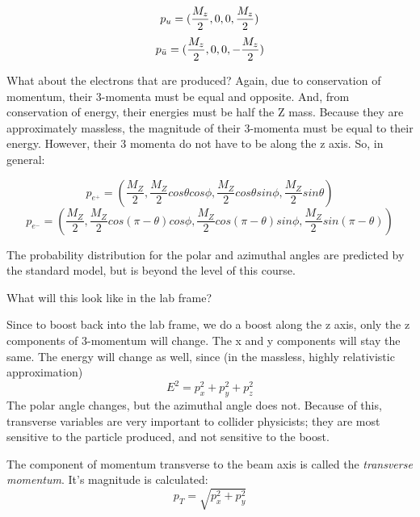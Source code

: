 \begin{equation}
 p_{u} = ( {M_z \over 2},0,0,{M_z \over 2})
\end{equation}
\begin{equation}
 p_{\bar{u}} = ( {M_z \over 2},0,0,-{M_z \over 2})
\end{equation}

\noindent What about the electrons that are produced?  Again, due to conservation of momentum, their 3-momenta must be equal and opposite.  And, from conservation of energy, their energies must be half the Z mass.  Because they are approximately massless, the magnitude of their 3-momenta must be equal to their energy.  However, their 3 momenta do not have to be along the z axis.  So, in general:

\begin{equation}
 p_{e^+} = (\frac{M_Z}{2}, \frac{M_Z}{2} cos \theta cos \phi ,  \frac{M_Z}{2} cos \theta sin \phi , \frac{M_Z}{2} sin \theta) 
\end{equation}
\begin{equation}
 p_{e^-} = (\frac{M_Z}{2}, \frac{M_Z}{2} cos (\pi - \theta) cos \phi ,  \frac{M_Z}{2} cos  (\pi - \theta) sin \phi , \frac{M_Z}{2} sin  (\pi - \theta)) 
\end{equation}


	  
The probability distribution for the polar and azimuthal angles are predicted by the standard model, but is beyond the level of this course.

What will this look like in the lab frame?

Since to boost back into the lab frame, we do a boost along the z axis, only the z components of 3-momentum will change.  The x and y components will stay the same.  The energy will change as well, since (in the massless, highly relativistic approximation)
\begin{equation}
E^2 = p_x^2 + p_y^2 + p_z^2   
\end{equation}
The polar angle changes, but the azimuthal angle does not.  Because of this, transverse variables are very important to collider physicists; they are most sensitive to the particle produced, and not sensitive to the boost.

The component of momentum transverse to the beam axis is called the {\it transverse momentum}.  It's magnitude is calculated:
\begin{equation}
	 p_T =   \sqrt{p_x^2 +p_y^2}
\end{equation} 
  

